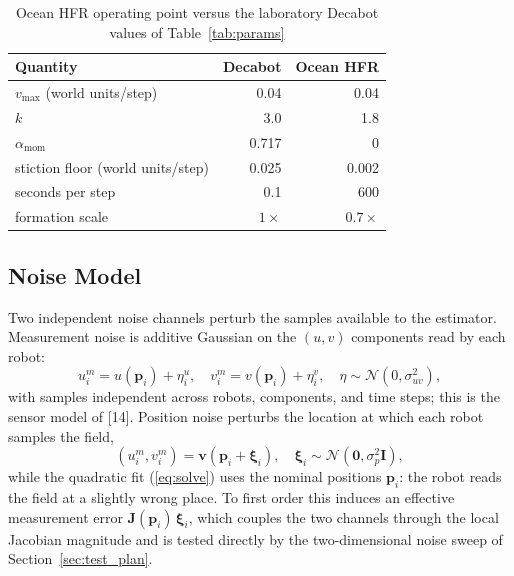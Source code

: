 \documentclass[lettersize,journal]{IEEEtran}
\begin{document}
\begin{table}[!t]
\centering
\caption{Ocean HFR operating point versus the laboratory Decabot values of Table~\ref{tab:params}}
\label{tab:ocean_params}
\footnotesize
\setlength{\tabcolsep}{4pt}
\begin{tabular}{lrr}
\hline
\textbf{Quantity} & \textbf{Decabot} & \textbf{Ocean HFR} \\
\hline
$v_{\max}$ (world units/step) & 0.04 & 0.04 \\
$k$ & 3.0 & 1.8 \\
$\alpha_{\text{mom}}$ & 0.717 & 0 \\
stiction floor (world units/step) & 0.025 & 0.002 \\
seconds per step & 0.1 & 600 \\
formation scale & $1\times$ & $0.7\times$ \\
\hline
\end{tabular}
\end{table}

\subsection{Noise Model}
\label{sec:noise_model}

Two independent noise channels perturb the samples available to the
estimator. Measurement noise is additive Gaussian on the $(u, v)$
components read by each robot:
\begin{equation}
    u_i^m = u(\mathbf{p}_i) + \eta_i^u, \quad
    v_i^m = v(\mathbf{p}_i) + \eta_i^v,
    \quad \eta \sim \mathcal{N}(0, \sigma_{uv}^2),
    \label{eq:meas_noise}
\end{equation}
with samples independent across robots, components, and time steps; this
is the sensor model of [14]. Position noise perturbs the location at
which each robot samples the field,
\begin{equation}
    (u_i^m, v_i^m) = \mathbf{v}(\mathbf{p}_i + \boldsymbol{\xi}_i), \quad
    \boldsymbol{\xi}_i \sim \mathcal{N}(\mathbf{0}, \sigma_p^2 \mathbf{I}),
    \label{eq:pos_noise}
\end{equation}
while the quadratic fit (\ref{eq:solve}) uses the nominal positions
$\mathbf{p}_i$: the robot reads the field at a slightly wrong place. To
first order this induces an effective measurement error
$\mathbf{J}(\mathbf{p}_i)\,\boldsymbol{\xi}_i$, which couples the two
channels through the local Jacobian magnitude and is tested directly by
the two-dimensional noise sweep of Section~\ref{sec:test_plan}.
\end{document}
